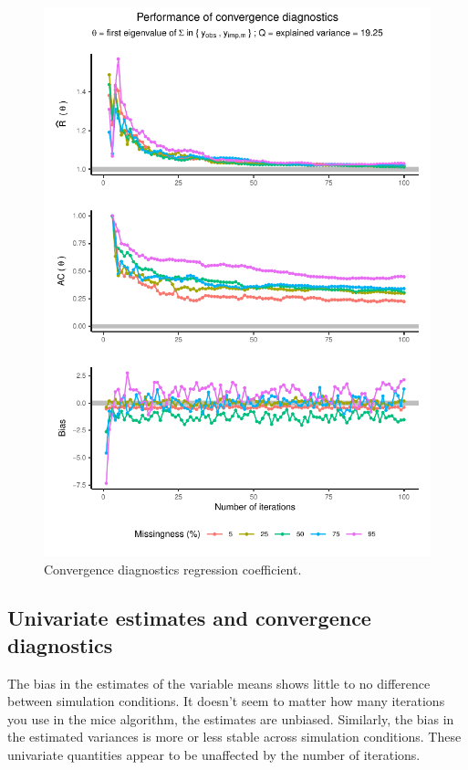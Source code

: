 \documentclass[Royal,times,sageh]{sagej}
\begin{document}
\begin{figure}

{\centering \includegraphics{manuscript_files/figure-latex/pred-1} 

}

\caption{Convergence diagnostics regression coefficient.}\label{fig:pred}
\end{figure}

\hypertarget{univariate-estimates-and-convergence-diagnostics}{%
\subsection{Univariate estimates and convergence
diagnostics}\label{univariate-estimates-and-convergence-diagnostics}}

The bias in the estimates of the variable means shows little to no
difference between simulation conditions. It doesn't seem to matter how
many iterations you use in the mice algorithm, the estimates are
unbiased. Similarly, the bias in the estimated variances is more or less
stable across simulation conditions. These univariate quantities appear
to be unaffected by the number of iterations.
\end{document}
